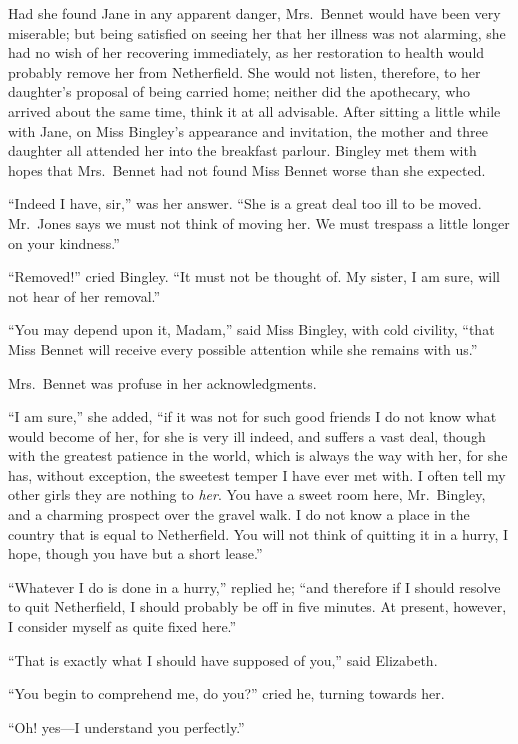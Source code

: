 Had she found Jane in any apparent danger, Mrs.\ Bennet would
have been very miserable; but being satisfied on seeing her that
her illness was not alarming, she had no wish of her recovering
immediately, as her restoration to health would probably remove
her from Netherfield.  She would not listen, therefore, to her
daughter's proposal of being carried home; neither did the
apothecary, who arrived about the same time, think it at all
advisable.  After sitting a little while with Jane, on Miss
Bingley's appearance and invitation, the mother and three
daughter all attended her into the breakfast parlour.  Bingley met
them with hopes that Mrs.\ Bennet had not found Miss Bennet
worse than she expected.

``Indeed I have, sir,'' was her answer.  ``She is a great deal too
ill to be moved.  Mr.\ Jones says we must not think of moving her.
We must trespass a little longer on your kindness.''

``Removed!'' cried Bingley.  ``It must not be thought of.  My
sister, I am sure, will not hear of her removal.''

``You may depend upon it, Madam,'' said Miss Bingley, with cold
civility, ``that Miss Bennet will receive every possible attention
while she remains with us.''

Mrs.\ Bennet was profuse in her acknowledgments.

``I am sure,'' she added, ``if it was not for such good friends I do
not know what would become of her, for she is very ill indeed,
and suffers a vast deal, though with the greatest patience in the
world, which is always the way with her, for she has, without
exception, the sweetest temper I have ever met with.  I often tell
my other girls they are nothing to \emph{her}.  You have a sweet room
here, Mr.\ Bingley, and a charming prospect over the gravel walk.
I do not know a place in the country that is equal to Netherfield.
You will not think of quitting it in a hurry, I hope, though you
have but a short lease.''

``Whatever I do is done in a hurry,'' replied he; ``and therefore if I
should resolve to quit Netherfield, I should probably be off in
five minutes.  At present, however, I consider myself as quite
fixed here.''

``That is exactly what I should have supposed of you,'' said
Elizabeth.

``You begin to comprehend me, do you?'' cried he, turning
towards her.

``Oh! yes---I understand you perfectly.''

